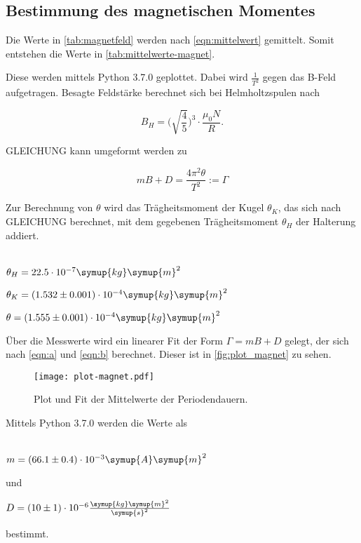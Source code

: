\subsection{Bestimmung des magnetischen Momentes}


Die Werte in \autoref{tab:magnetfeld} werden nach \eqref{eqn:mittelwert} gemittelt. Somit entstehen die Werte in \autoref{tab:mittelwerte-magnet}.



Diese werden mittels Python 3.7.0 geplottet. Dabei wird $\frac{1}{T^2}$ gegen das B-Feld aufgetragen. Besagte Feldstärke berechnet sich bei Helmholtzspulen nach

\begin{equation}
    B_H = \bigg( \sqrt{\frac{4}{5}} \bigg)^3 \cdot \frac{\mu_0 N}{R}.
\end{equation}

GLEICHUNG kann umgeformt werden zu

\begin{equation}
  mB + D = \frac{4 \pi^2 \theta}{T^2} := \Gamma
\end{equation}

Zur Berechnung von $\theta$ wird das Trägheitsmoment der Kugel $\theta_K$, das sich nach GLEICHUNG berechnet, mit dem gegebenen Trägheitsmoment $\theta_H$ der Halterung addiert.
\\ \\
\centerline{$\theta_H = 22.5 \cdot 10^{-7} \symup{kg} \symup{m}^2$}

\centerline{$\theta_K = (1.532 \pm 0.001) \cdot 10^{-4} \symup{kg} \symup{m}^2$}

\centerline{$\theta = (1.555 \pm 0.001) \cdot 10^{-4} \symup{kg} \symup{m}^2$}

Über die Messwerte wird ein linearer Fit der Form $\Gamma = mB + D$ gelegt, der sich nach \eqref{eqn:a} und \eqref{eqn:b} berechnet.
Dieser ist in \autoref{fig:plot_magnet} zu sehen.

\begin{figure}
  \centering
  \texttt{[image: plot-magnet.pdf]}
  \caption{Plot und Fit der Mittelwerte der Periodendauern.}
  \label{fig:plot_magnet}
\end{figure}

Mittels Python 3.7.0 werden die Werte als
\\ \\
\centerline{$m = (66.1 \pm 0.4) \cdot 10^{-3} \symup{A}\symup{m}^2$}

und

\centerline{$D = (10 \pm 1) \cdot 10^{-6} \frac{\symup{kg} \symup{m}^2}{\symup{s}^2}$}

bestimmt.
